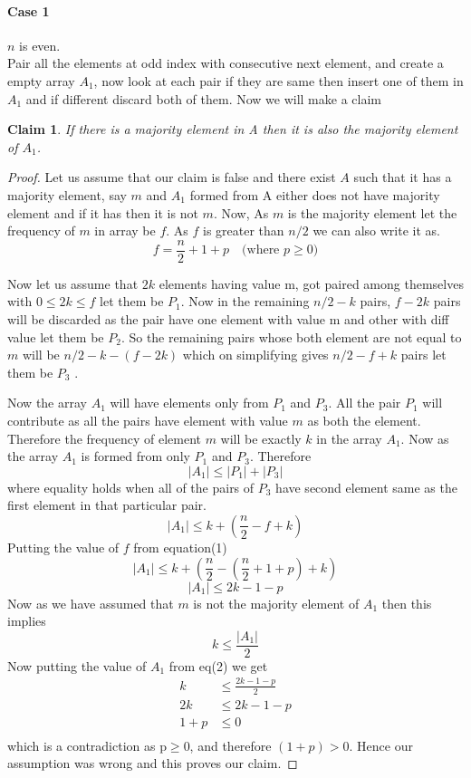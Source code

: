 \documentclass[answers]{exam}
\newtheorem{claim}{Claim}
\begin{document}
\begin{questions}
\begin{parts}
\begin{solution}
\paragraph {Case 1} $n$ is even.\\
Pair all the elements at odd index with consecutive next element, and create a empty array $A_{1}$, now look at each pair if they are same then insert one of them in $A_{1}$ and if different discard both of them. Now we will make a claim
\begin{claim}
If there is a majority element in A then it is also the majority element of $A_{1}$.
\end{claim}
\begin{proof}
 Let us assume that our claim is false and there exist $A$ such that it has a majority element, say $m$ and $A_{1}$ formed from A either does not have majority element and if it has then it is not $m$. Now, As $m$ is the majority element let the frequency of $m$ in array be $f$. As $f$ is greater than $n/2$ we can also write it as.
\setcounter{equation}{0}
\begin{equation}
f=\frac{n}{2}+1+p  \quad \text{(where $p \geq 0$)}
\end{equation}

Now let us assume that $2k$ elements having value m, got paired among themselves with $0\leq 2k \leq f$ let them be $P_{1}$. Now in the remaining $n/2-k$ pairs, $f-2k$ pairs will be discarded as the pair have one element with value m and other with diff value let them be $P_{2}$. So the remaining pairs whose both element are not equal to $m$ will be $n/2-k-(f-2k)$ which on simplifying gives $n/2-f+k$ pairs let them be $P_{3}$ .

Now the array $A_{1}$ will have elements only from $P_{1}$ and $P_{3}$. All the pair $P_{1}$ will contribute as all the pairs have element with value $m$ as both the element. Therefore the frequency of element $m$ will be exactly $k$ in the array $A_{1}$. Now as the array $A_{1}$ is formed from only $P_{1}$ and $P_{3}$. Therefore
\[
|A_{1}|\leq|P_{1}|+|P_{3}|
\]
where equality holds when all of the pairs of $P_{3}$ have second element same as the first element in that particular pair.
\[
|A_{1}|\leq k+ (\frac{n}{2}-f+k)
\]
Putting the value of $f$ from equation(1)
\[
|A_{1}|\leq k+  (\frac{n}{2}-(\frac{n}{2}+1+p)+k)
\]
\begin{equation}
|A_{1}|\leq 2k-1-p
\end{equation}
Now as we have assumed that $m$ is not the majority element of $A_{1}$ then this implies
\[
k \leq \frac{|A_{1}|}{2}
\]
Now putting the value of $A_{1}$ from eq(2) we get
\begin{align*}
k &\leq \frac{2k-1-p}{2}\\
2k &\leq 2k-1-p\\
1+p &\leq 0\\
\end{align*}
which is a contradiction as p$\geq$0, and therefore $(1+p) > 0$. Hence our assumption was wrong and this proves our claim.
\end{proof}


\end{solution}
\end{parts}
\end{questions}
\end{document}

